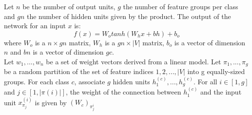 \documentclass [a4paper, 11pt, oneside, final]{article}
\numberwithin{equation}{section}		%
\numberwithin{figure}{section}			%
\numberwithin{table}{section}				%
\begin{document}
\begin{enumerate}
\begin{enumerate}
Let $n$ be the number of output units, $g$ the number of feature groups per class and $gn$ the number of hidden units given by the product.
The output of the network for an input $x$ is:
$$ f(x) = W_{o}tanh(W_{h}x + bh) + b_{o}$$ where $W_{o}$ is a $n \times gn$ matrix, $W_{h}$ is a $gn \times |V|$ matrix, $b_{o}$ is a vector of dimension
$n$ and $bn$ is a vector of dimension $gc$.\\
Let ${w_{1}, . . . , w_{n}}$ be a set of weight vectors derived from a linear model. Let ${\pi_{1}, . . . , \pi_{g}}$ be a random partition of the set of feature indices ${1, 2, . . . , |V |}$  into g equally-sized groups. For each class $c$, associate $g$ hidden units ${h_{1}^{(c)}, . . . , h_{g}^{(c)}}$.
 For all $i \in [1, g]$ and $j \in [1, |\pi(i) |]$, the weight of the connection between $h_{1}^{(c)}$ and the input unit $x_{\pi_{j}}^{(i)} $ is given by $(W_{c})_{\pi_{j}^{i}}$
\end{enumerate}
 
\end{enumerate}
\end{document}
